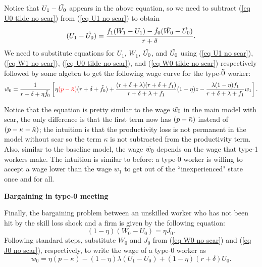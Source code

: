 \documentclass[12pt]{article} %
\theoremstyle{definition}
\begin{document}
Notice that $U_1-\Tilde{U_0}$ appears in the above equation, so we need to subtract (\ref{eq U0 tilde no scar}) from (\ref{eq U1 no scar}) to obtain 
\begin{equation}
(U_1-\Tilde{U_0}) = \frac{f_1(W_1-U_1) - \Tilde{f_0}(\Tilde{W_0}-\Tilde{U_0})}{r+\delta}.\label{eq U1 tilde-U0 tilde no scar}
    \end{equation}
We need to substitute equations  for $U_1$, $W_1$, $\Tilde{U_0}$, and $\Tilde{U_0}$ using (\ref{eq U1 no scar}), (\ref{eq W1 no scar}), (\ref{eq U0 tilde no scar}), and (\ref{eq W0 tilde no scar}) respectively followed by some algebra to get the following wage curve for the type-$\Tilde{0}$ worker: 
    \begin{equation} 
\Tilde{w_0} = \frac{1}{r+\delta+\eta \Tilde{f_0}}\left[\eta\textcolor{red}{(p-\Tilde{\kappa})}(r+\delta+ \Tilde{f_0})+\frac{(r+\delta+\lambda)(r+\delta+f_1)}{r+\delta+\lambda+f_1}(1-\eta)z - \frac{\lambda(1-\eta)f_1}{r+\delta+\lambda+f_1}w_1 \right]. \label{eq WC0 tilde no scar}
\end{equation}

Notice that the equation is pretty similar to the wage $\Tilde{w_0}$ in the main model with scar, the only difference is that the first term now has $(p-\Tilde{\kappa})$ instead of $(p-\kappa-\Tilde{\kappa})$; the intuition is that the productivity loss is not permanent in the model without scar so the term $\kappa$ is not subtracted from the productivity term. Also, similar to the baseline model, the wage $\Tilde{w_0}$ depends on the wage that type-1 workers make. The intuition is similar to before: a type-$\tilde{0}$ worker is willing to accept a wage lower than the wage $w_1$  to get out of the ``inexperienced" state once and for all. 

\bigskip 
    
\noindent \textbf{Bargaining in type-0 meeting}

\medskip 

\noindent Finally, the bargaining problem between an unskilled worker who has not been hit by the skill loss shock and a firm is given by the following equation: 
\begin{equation}
       (1-\eta)(W_0-U_0) = \eta J_0 .  \nonumber 
\end{equation}Following standard steps, substitute ${W_0}$ and ${J_0}$ from (\ref{eq W0 no scar}) and (\ref{eq J0 no scar}), respectively, to write the wage of a type-0 worker as
\begin{equation}
    w_0 = \eta(p-\kappa) - (1-\eta)\lambda(U_1 - U_0) + (1-\eta)(r+\delta) U_0. \nonumber 
    \end{equation}
    
\end{document}
